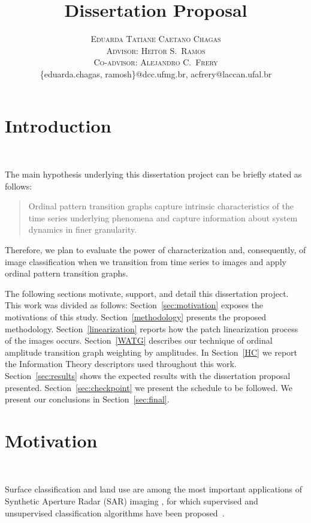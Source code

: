 \documentclass[paper=letter, fontsize=12pt]{article}
\title{\vspace{-10mm}\fontsize{24pt}{10pt}\selectfont\textbf{ 
		Dissertation Proposal \\ \vspace{8mm} \normalfont{A study about ordinal patterns transition graphs}}}
\author{
	\large
	{\textsc{Eduarda Tatiane Caetano Chagas}}\\[2mm]
	{\textsc{Advisor: Heitor S.\ Ramos}}\\[2mm]
	{\textsc{Co-advisor: Alejandro C.\ Frery}}\\[2mm]
	\normalsize {\{eduarda.chagas, ramosh\}@dcc.ufmg.br, acfrery@laccan.ufal.br}\\[2mm]
}
\date{}
\begin{document}
	\maketitle 
	\thispagestyle{fancy}
	
	\onehalfspacing 
	
	\section{Introduction}~\label{sec:introduction}
	
	The main hypothesis underlying this dissertation project can be briefly stated as follows:
	
	\begin{quote}
		
		Ordinal pattern transition graphs capture intrinsic characteristics of the time series underlying phenomena and capture information about system dynamics in finer granularity.
		
	\end{quote}
	
	
	Therefore, we plan to evaluate the power of characterization and, consequently, of image classification when we transition from time series to images and apply ordinal pattern transition graphs.
	
	The following sections motivate, support, and detail this dissertation project.
	This work was divided as follows:
	Section~\ref{sec:motivation} exposes the motivations of this study.
	Section~\ref{methodology} presents the proposed methodology.
	Section~\ref{linearization} reports how the patch linearization process of the images occurs.
	Section~\ref{WATG} describes our technique of ordinal amplitude transition graph weighting by amplitudes.
	In Section~\ref{HC} we report the Information Theory descriptors used throughout this work.
	Section~\ref{sec:results} shows the expected results with the dissertation proposal presented.
	Section~\ref{sec:checkpoint} we present the schedule to be followed.
	We present our conclusions in Section~\ref{sec:final}.
	
	
	\section{Motivation}~\label{sec:motivation}
	
	Surface classification and land use are among the most important applications of Synthetic Aperture Radar (SAR) imaging \cite{Pottier2004Unsupervised}, for which supervised and unsupervised classification algorithms have been proposed~\cite{Chen1996multifrequency,Bhattacharya2018Unsupervised,ZYL1992Bayesian}.
	
\end{document}
